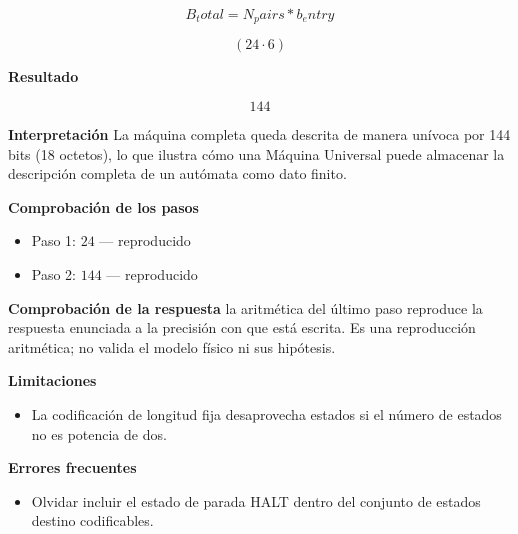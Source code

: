 \documentclass{book}
\begin{document}
\begin{tcolorbox}[title={Problema resuelto}, studiumworked, breakable]
\begin{enumerate}
\[
B_total = N_pairs * b_entry
\]

\[
\left(24\cdot 6\right)
\]
\end{enumerate}

\noindent\textbf{Resultado}

\[
144
\]

\noindent\textbf{Interpretación}
La máquina completa queda descrita de manera unívoca por 144 bits (18 octetos), lo que ilustra cómo una Máquina Universal puede almacenar la descripción completa de un autómata como dato finito.

\noindent\textbf{Comprobación de los pasos}
\begin{itemize}
\item Paso 1: $24$ — reproducido
\item Paso 2: $144$ — reproducido
\end{itemize}

\noindent\textbf{Comprobación de la respuesta} la aritmética del último paso reproduce la respuesta enunciada a la precisión con que está escrita. Es una reproducción aritmética; no valida el modelo físico ni sus hipótesis.

\noindent\textbf{Limitaciones}
\begin{itemize}
\item La codificación de longitud fija desaprovecha estados si el número de estados no es potencia de dos.
\end{itemize}

\noindent\textbf{Errores frecuentes}
\begin{itemize}
\item Olvidar incluir el estado de parada HALT dentro del conjunto de estados destino codificables.
\end{itemize}
\end{tcolorbox}
\end{document}
